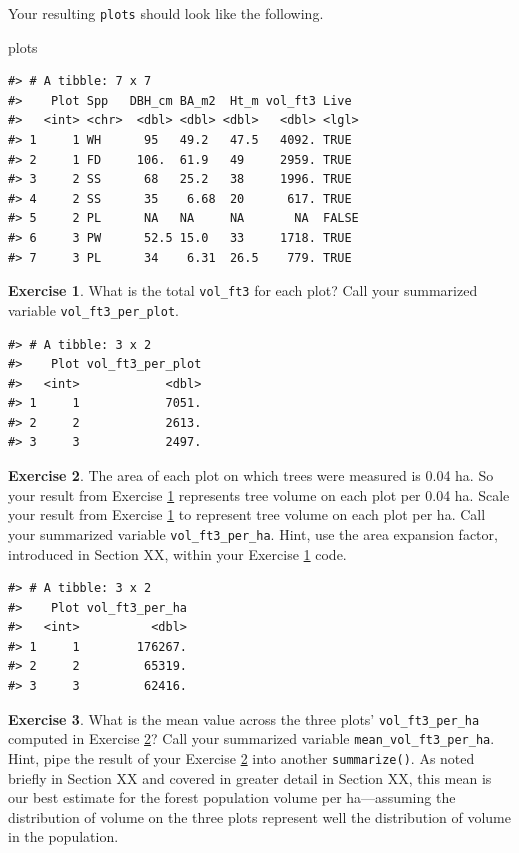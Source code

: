 \documentclass[
  11pt,
]{krantz}
\newenvironment{Shaded}{\begin{snugshade}}{\end{snugshade}}
\newcommand{\NormalTok}[1]{#1}
\theoremstyle{definition}
\theoremstyle{definition}
\theoremstyle{definition}
\newtheorem{exercise}{Exercise}[chapter]
\theoremstyle{definition}
\theoremstyle{remark}
\begin{document}
Your resulting \texttt{plots} should look like the following.

\begin{Shaded}
\begin{Highlighting}[]
\NormalTok{plots}
\end{Highlighting}
\end{Shaded}

\begin{verbatim}
#> # A tibble: 7 x 7
#>    Plot Spp   DBH_cm BA_m2  Ht_m vol_ft3 Live 
#>   <int> <chr>  <dbl> <dbl> <dbl>   <dbl> <lgl>
#> 1     1 WH      95   49.2   47.5   4092. TRUE 
#> 2     1 FD     106.  61.9   49     2959. TRUE 
#> 3     2 SS      68   25.2   38     1996. TRUE 
#> 4     2 SS      35    6.68  20      617. TRUE 
#> 5     2 PL      NA   NA     NA       NA  FALSE
#> 6     3 PW      52.5 15.0   33     1718. TRUE 
#> 7     3 PL      34    6.31  26.5    779. TRUE
\end{verbatim}

\begin{exercise}
\protect\hypertarget{exr:dplyr22}{}\label{exr:dplyr22}What is the total \texttt{vol\_ft3} for each plot? Call your summarized variable \texttt{vol\_ft3\_per\_plot}.
\end{exercise}

\begin{verbatim}
#> # A tibble: 3 x 2
#>    Plot vol_ft3_per_plot
#>   <int>            <dbl>
#> 1     1            7051.
#> 2     2            2613.
#> 3     3            2497.
\end{verbatim}

\begin{exercise}
\protect\hypertarget{exr:dplyr23}{}\label{exr:dplyr23}The area of each plot on which trees were measured is 0.04 ha. So your result from Exercise \ref{exr:dplyr22} represents tree volume on each plot per 0.04 ha. Scale your result from Exercise \ref{exr:dplyr22} to represent tree volume on each plot per ha. Call your summarized variable \texttt{vol\_ft3\_per\_ha}. Hint, use the area expansion factor, introduced in Section XX, within your Exercise \ref{exr:dplyr22} code.
\end{exercise}

\begin{verbatim}
#> # A tibble: 3 x 2
#>    Plot vol_ft3_per_ha
#>   <int>          <dbl>
#> 1     1        176267.
#> 2     2         65319.
#> 3     3         62416.
\end{verbatim}

\begin{exercise}
\protect\hypertarget{exr:dplyr24}{}\label{exr:dplyr24}What is the mean value across the three plots' \texttt{vol\_ft3\_per\_ha} computed in Exercise \ref{exr:dplyr23}? Call your summarized variable \texttt{mean\_vol\_ft3\_per\_ha}. Hint, pipe the result of your Exercise \ref{exr:dplyr23} into another \texttt{summarize()}. As noted briefly in Section XX and covered in greater detail in Section XX, this mean is our best estimate for the forest population volume per ha---assuming the distribution of volume on the three plots represent well the distribution of volume in the population.
\end{exercise}
\end{document}
